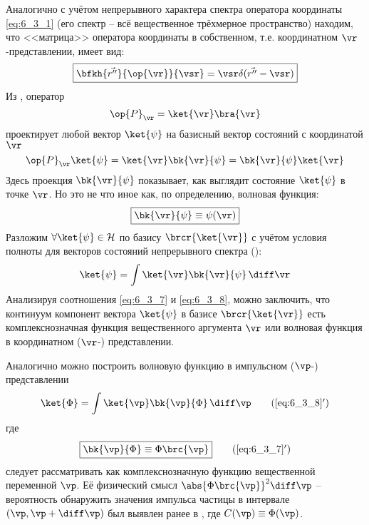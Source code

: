 Аналогично с учётом непрерывного характера спектра оператора координаты \eqref{eq:6_3_1} (его спектр -- всё вещественное трёхмерное пространство) находим, что <<матрица>> оператора координаты в собственном, т.е. координатном $\vr$-представлении, имеет вид:%
\begin{equation}
\label{eq:6_3_4}
\boxed{\bfkh{\vec{r''}}{\op{\vr}}{\vsr}=\vsr \delta(\vec{r''}-\vsr)}
\end{equation}%
%
Из , оператор
\begin{equation}
\label{eq:6_3_5}
\op{P}_{\vr}=\ket{\vr}\bra{\vr}
\end{equation}%
%
проектирует любой вектор $\ket{\psi}$ на базисный вектор состояний с координатой $\vr$
\begin{equation}
\label{eq:6_3_6}
\op{P}_{\vr} \ket{\psi} = \ket{\vr}\bk{\vr}{\psi} = \bk{\vr}{\psi} \ket{\vr}
\end{equation}%
%
Здесь проекция $\bk{\vr}{\psi}$ показывает, как выглядит состояние $\ket{\psi}$ в точке $\vr$. Но это не что иное как, по определению, волновая функция:
\begin{equation}
\label{eq:6_3_7}
\boxed{
	\bk{\vr}{\psi} \equiv \psi(\vr)
}
\end{equation}%
%
Разложим $\forall \ket{\psi} \in \mathcal{H}$ по базису $\brcr{\ket{\vr}}$ с учётом условия полноты для векторов состояний непрерывного спектра ():
\begin{equation}
\label{eq:6_3_8}
\ket{\psi}=\int \ket{\vr}\bk{\vr}{\psi} \, \diff\vr
\end{equation}%
%
Анализируя соотношения \eqref{eq:6_3_7} и \eqref{eq:6_3_8}, можно заключить, что континуум компонент вектора $\ket{\psi}$ в базисе $\brcr{\ket{\vr}}$ есть комплекснозначная функция вещественного аргумента $\vr$ или волновая функция в координатном ($\vr$-) представлении.

Аналогично можно построить волновую функцию в импульсном ($\vp$-) представлении
\begin{equation}
\label{eq:6_3_8_add}
\ket{\Phi}=\int \ket{\vp}\bk{\vp}{\Phi} \, \diff\vp
\tag{\ref{eq:6_3_8}$'$}
\end{equation}%
где%
\begin{equation}
\label{eq:6_3_7_add}
\boxed{\bk{\vp}{\Phi} \equiv \Phi\brc{\vp}}
\tag{\ref{eq:6_3_7}$'$}
\end{equation}%
%
следует рассматривать как комплекснозначную функцию вещественной переменной $\vp$. Её физический смысл $\abs{\Phi\brc{\vp}}^2 \diff\vp$ -- вероятность обнаружить значения импульса частицы в интервале $(\vp, \vp+\diff\vp)$ был выявлен ранее в , где $C(\vp) \equiv \Phi(\vp)$.

